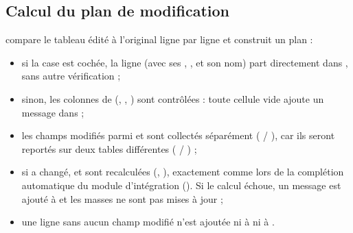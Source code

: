 \documentclass[letterpaper,10pt,english]{sphinxmanual}
\begin{document}
\subsection{Calcul du plan de modification}
\label{\detokenize{5_Management:calcul-du-plan-de-modification}}
\sphinxAtStartPar
{} compare le tableau édité à l’original ligne par ligne et
construit un plan  :
\begin{itemize}
\item {} 
\sphinxAtStartPar
si la case  est cochée, la ligne (avec ses , ,
 et son nom) part directement dans , sans autre vérification ;

\item {} 
\sphinxAtStartPar
sinon, les colonnes de  (, , )
sont contrôlées : toute cellule vide ajoute un message dans  ;

\item {} 
\sphinxAtStartPar
les champs modifiés parmi  et  sont
collectés séparément ( / ), car ils seront reportés sur
deux tables différentes ( / ) ;

\item {} 
\sphinxAtStartPar
si  a changé,  et  sont recalculées
({\hyperref[\detokenize{api:utils.molecular_weight.molecular_weight}]{}}, {\hyperref[\detokenize{api:utils.monoisotopic.monoisotopic_mass}]{}}),
exactement comme lors de la complétion automatique du module d’intégration ().
Si le calcul échoue, un message est ajouté à  et les masses ne sont pas mises à jour ;

\item {} 
\sphinxAtStartPar
une ligne sans aucun champ modifié n’est ajoutée ni à  ni à .

\end{itemize}
\end{document}
